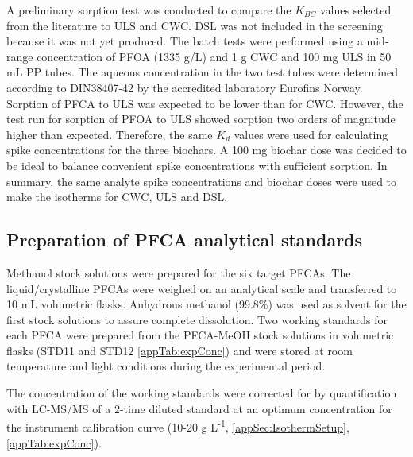A preliminary sorption test was conducted to compare the $K_{BC}$ values selected from the literature to ULS and CWC. DSL was not included in the screening because it was not yet produced. The batch tests were performed using a mid-range concentration of PFOA (1335 {\textmu}g/L) and 1 g CWC and 100 mg ULS in 50 mL PP tubes. The aqueous concentration in the two test tubes were determined according to DIN38407-42 by the accredited laboratory Eurofins Norway. Sorption of PFCA to ULS was expected to be lower than for CWC. However, the test run for sorption of PFOA to ULS showed sorption two orders of magnitude higher than expected. Therefore, the same $K_d$ values were used for calculating spike concentrations for the three biochars. A 100 mg biochar dose was decided to be ideal to balance convenient spike concentrations with sufficient sorption. In summary, the same analyte spike concentrations and biochar doses were used to make the isotherms for CWC, ULS and DSL.

\subsection{Preparation of PFCA analytical standards}\label{ssec:PFCAanalytic}
Methanol stock solutions were prepared for the six target PFCAs. The liquid/crystalline PFCAs were weighed on an analytical scale and transferred to 10 mL volumetric flasks. Anhydrous methanol (99.8\%) was used as solvent for the first stock solutions to assure complete dissolution. Two working standards for each PFCA were prepared from the PFCA-MeOH stock solutions in volumetric flasks (STD11 and STD12 \cref{appTab:expConc}) and were stored at room temperature and light conditions during the experimental period. 

The concentration of the working standards were corrected for by quantification with LC-MS/MS of a 2-time diluted standard at an optimum concentration for the instrument calibration curve (10-20 \textmu g L\textsuperscript{-1}, \cref{appSec:IsothermSetup}, \cref{appTab:expConc}).

